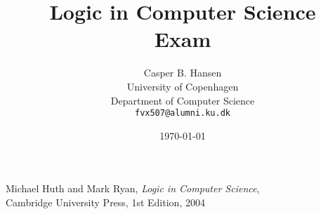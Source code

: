 \documentclass[10pt,a4paper]{article}
\title
{
	{\Large Logic in Computer Science}\\
	Exam
}
\author
{
	Casper B. Hansen\\
	University of Copenhagen\\
	Department of Computer Science\\
	{\tt fvx507@alumni.ku.dk}
}
\date{\today}
\begin{document}
\clearpage\maketitle
\thispagestyle{empty}
\maketitle
\vfill
\begin{thebibliography}{9}

	Michael Huth and Mark Ryan,
	{\it Logic in Computer Science},\\
	Cambridge University Press,
	1st Edition, 2004

\end{thebibliography}







\end{document}
